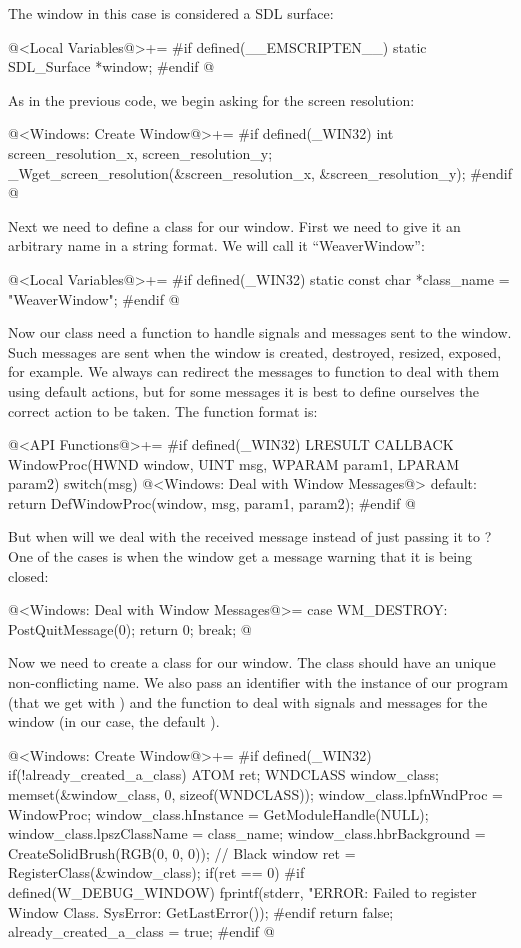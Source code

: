 The window in this case is considered a SDL surface:

\iniciocodigo
@<Local Variables@>+=
#if defined(__EMSCRIPTEN__)
static SDL_Surface *window;
#endif
@
\fimcodigo


As in the previous code, we begin asking for the screen resolution:

\iniciocodigo
@<Windows: Create Window@>+=
#if defined(_WIN32)
int screen_resolution_x, screen_resolution_y;
_Wget_screen_resolution(&screen_resolution_x, &screen_resolution_y);
#endif
@
\fimcodigo

Next we need to define a class for our window. First we need to give
it an arbitrary name in a string format. We will call it
``WeaverWindow'':

\iniciocodigo
@<Local Variables@>+=
#if defined(_WIN32)
static const char *class_name = "WeaverWindow";
#endif
@
\fimcodigo

Now our class need a function to handle signals and messages sent to
the window. Such messages are sent when the window is created,
destroyed, resized, exposed, for example. We always can redirect the
messages to function  to deal with them
using default actions, but for some messages it is best to define
ourselves the correct action to be taken. The function format is:

\iniciocodigo
@<API Functions@>+=
#if defined(_WIN32)
LRESULT CALLBACK WindowProc(HWND window, UINT msg, WPARAM param1, LPARAM param2){
  switch(msg){
    @<Windows: Deal with Window Messages@>
    default:
      return DefWindowProc(window, msg, param1, param2);
  }
}
#endif
@
\fimcodigo

But when will we deal with the received message instead of just
passing it to ? One of the cases is when the
window get a message warning that it is being closed:

\iniciocodigo
@<Windows: Deal with Window Messages@>=
case WM_DESTROY:
  PostQuitMessage(0);
  return 0;
  break;
@
\fimcodigo

Now we need to create a class for our window. The class should have an
unique non-conflicting name. We also pass an identifier with the
instance of our program (that we get
with ) and the function to deal with
signals and messages for the window (in our case, the
default ).

\iniciocodigo
@<Windows: Create Window@>+=
#if defined(_WIN32)
if(!already_created_a_class){
  ATOM ret;
  WNDCLASS window_class;
  memset(&window_class, 0, sizeof(WNDCLASS));
  window_class.lpfnWndProc = WindowProc;
  window_class.hInstance = GetModuleHandle(NULL);
  window_class.lpszClassName = class_name;
  window_class.hbrBackground = CreateSolidBrush(RGB(0, 0, 0)); // Black window
  ret = RegisterClass(&window_class);
  if(ret == 0){
#if defined(W_DEBUG_WINDOW)
    fprintf(stderr, "ERROR: Failed to register Window Class. SysError: %
            GetLastError());
#endif
    return false;
  }
  already_created_a_class = true;
}
#endif
@
\fimcodigo

